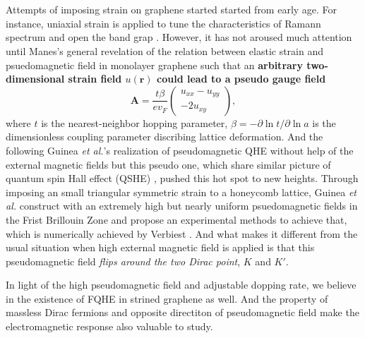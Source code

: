 \documentclass[bachelor,english,numbers]{ustcthesis}
\begin{document}
	\section{}
		\indent\par Attempts of imposing strain on graphene started started from early age. For instance, uniaxial strain is applied to tune the characteristics of Ramann spectrum and open the band grap \cite{ni2008uniaxial,farjam2009comment}. However, it has not aroused much attention until Manes's general revelation of the relation between elastic strain and psuedomagnetic field in monolayer graphene \cite{manes2007symmetry} such that an {\bf arbitrary two-dimensional strain field $u(\bm{r})$ could lead to a pseudo gauge field}
		\begin{equation}\label{1.1.1}
			\bm{A}=\dfrac{t\beta}{ev_F}\left(\begin{array}{c}u_{xx}-u_{yy}\\-2u_{xy}\end{array}\right),
		\end{equation}
		where $t$ is the nearest-neighbor hopping parameter, $\beta=-\partial\ln t/\partial\ln a$ is the dimensionless coupling parameter discribing lattice deformation. And the following Guinea {\it et al.}'s realization of pseudomagnetic QHE \cite{guinea2010energy} without help of the external magnetic fields but this pseudo one, which share similar picture of quantum spin Hall effect (QSHE) \cite{bernevig2006quantum}, pushed this hot spot to new heights. Through imposing an small triangular symmetric strain to a honeycomb lattice, Guinea {\it et al.} construct with an extremely high but nearly uniform psuedomagnetic fields in the Frist Brillouin Zone and propose an experimental methods to achieve that, which is numerically achieved by Verbiest \cite{verbiest2015uniformity}. And what makes it different from the usual situation when high external magnetic field is applied is that this pseudomagnetic field \emph{flips around the two Dirac point}, $K$ and $K'$.\par
		In light of the high pseudomagnetic field and adjustable dopping rate, we believe in the existence of FQHE in strined graphene as well. And the property of massless Dirac fermions and opposite directiton of pseudomagnetic field make the electromagnetic response also valuable to study.
\fi
\end{document}
